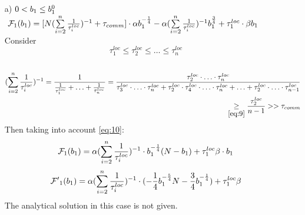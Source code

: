 \documentclass{article}
\begin{document}
\begin{itemize}
    \item [a)] $0 < b_1 \leq b_1^0\\$
    $~\mathcal{F}_1(b_1) = [N (\sum\limits_{i = 2}^{n} \frac{1}{\tau_i^{loc}})^{-1} + \tau_{comm}]\cdot 
    \alpha  b_1^{-\frac{1}{4}} - 
    \alpha(\sum\limits_{i =
    2}^{n} \frac{1}{\tau_i^{loc}})^{-1} b_1^{\frac{3}{4}}  + \tau_1^{loc}\cdot\beta b_1\\$
    Consider
    \begin{equation}
        \label{eq:9}
        \tau_1^{loc} \leq \tau_2^{loc} \leq\ldots \leq \tau_n^{loc}
    \end{equation}\\
    \begin{eqnarray}
        \label{eq:10}
        \begin{split}
            (\sum\limits_{i = 2}^n \frac{1}{\tau_i^{loc}})^{-1} = \frac{1}{\frac{1}{\tau_1^{loc}} + \ldots + \frac{1}{\tau_n^{loc}} } = \frac{\tau_2^{loc}\cdot \ldots \cdot\tau_n^{loc}}{\tau_3^{loc}\cdot \ldots \cdot\tau_n^{loc} + \tau_2^{loc}\cdot \tau_4^{loc}\cdot\ldots \cdot\tau_n^{loc} + \ldots + \tau_2^{loc}\cdot \ldots \cdot\tau_{n-1}^{loc}}\\ \underset{\ref{eq:9}}{\geq}\frac{\tau_2^{loc}}{n - 1} >> \tau_{comm}
        \end{split}
    \end{eqnarray}
    Then taking into account \ref{eq:10}:
    \begin{eqnarray}
        \notag
        \begin{split}
            \mathcal{F}_1(b_1) = \alpha(\sum\limits_{i = 2}^n \frac{1}{\tau_i^{loc}})^{-1}\cdot b_1^{-\frac{1}{4}}(N - b_1) + \tau_1^{loc}\beta\cdot b_1
        \end{split}
    \end{eqnarray}
    \begin{equation}
    \notag
        \mathcal{F'}_1 (b_1) = \alpha(\sum\limits_{i = 2}^n \frac{1}{\tau_i^{loc}})^{-1}\cdot (-\frac{1}{4}b_1^{-\frac{5}{4}}N - \frac{3}{4}b_1^{-\frac{1}{4}}) + \tau_1^{loc}\beta
    \end{equation}
    The analytical solution in this case is not given.


\end{itemize}
\end{document}
